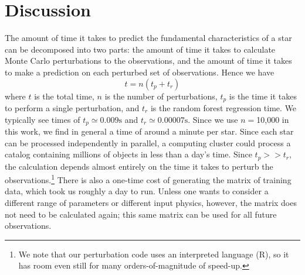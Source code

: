 \documentclass[manuscript]{aastex}
\begin{document}
\section{Discussion}
The amount of time it takes to predict the fundamental characteristics of a star can be decomposed into two parts: the amount of time it takes to calculate Monte Carlo perturbations to the observations, and the amount of time it takes to make a prediction on each perturbed set of observations. Hence we have
\begin{equation}
    t = n(t_p + t_r)
\end{equation}
where $t$ is the total time, $n$ is the number of perturbations, $t_p$ is the time it takes to perform a single perturbation, and $t_r$ is the random forest regression time. We typically see times of $t_p \simeq 0.009 \si{\s}$ and $t_r \simeq 0.00007 \si{\s}$. Since we use $n=$10,000 in this work, we find in general a time of around a minute per star. Since each star can be processed independently in parallel, a computing cluster could process a catalog containing millions of objects in less than a day's time. Since $t_p >> t_r$, the calculation depends almost entirely on the time it takes to perturb the observations.\footnote{We note that our perturbation code uses an interpreted language (R), so it has room even still for many orders-of-magnitude of speed-up.} There is also a one-time cost of generating the matrix of training data, which took us roughly a day to run. Unless one wants to consider a different range of parameters or different input physics, however, the matrix does not need to be calculated again; this same matrix can be used for all future observations. 
\end{document}
